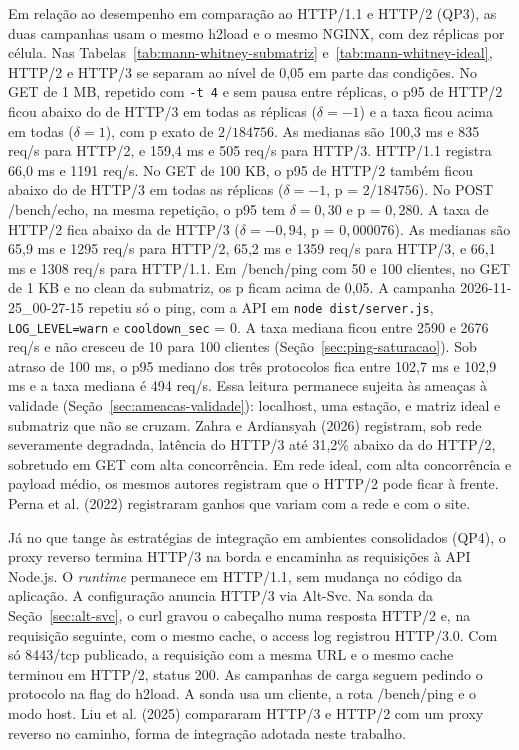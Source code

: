 Em relação ao desempenho em comparação ao HTTP/1.1 e HTTP/2 (QP3), as duas campanhas usam o mesmo h2load e o mesmo NGINX, com dez réplicas por célula. Nas Tabelas~\ref{tab:mann-whitney-submatriz} e~\ref{tab:mann-whitney-ideal}, HTTP/2 e HTTP/3 se separam ao nível de 0,05 em parte das condições. No GET de 1 MB, repetido com \texttt{-t 4} e sem pausa entre réplicas, o p95 de HTTP/2 ficou abaixo do de HTTP/3 em todas as réplicas ($\delta = -1$) e a taxa ficou acima em todas ($\delta = 1$), com p exato de $2/184756$. As medianas são 100,3 ms e 835 req/s para HTTP/2, e 159,4 ms e 505 req/s para HTTP/3. HTTP/1.1 registra 66,0 ms e 1191 req/s. No GET de 100 KB, o p95 de HTTP/2 também ficou abaixo do de HTTP/3 em todas as réplicas ($\delta = -1$, p = $2/184756$). No POST /bench/echo, na mesma repetição, o p95 tem $\delta = 0{,}30$ e p = $0{,}280$. A taxa de HTTP/2 fica abaixo da de HTTP/3 ($\delta = -0{,}94$, p = $0{,}000076$). As medianas são 65,9 ms e 1295 req/s para HTTP/2, 65,2 ms e 1359 req/s para HTTP/3, e 66,1 ms e 1308 req/s para HTTP/1.1. Em /bench/ping com 50 e 100 clientes, no GET de 1 KB e no clean da submatriz, os p ficam acima de 0,05. A campanha 2026-11-25\_00-27-15 repetiu só o ping, com a API em \texttt{node dist/server.js}, \texttt{LOG\_LEVEL=warn} e \texttt{cooldown\_sec} = 0. A taxa mediana ficou entre 2590 e 2676 req/s e não cresceu de 10 para 100 clientes (Seção~\ref{sec:ping-saturacao}). Sob atraso de 100 ms, o p95 mediano dos três protocolos fica entre 102,7 ms e 102,9 ms e a taxa mediana é 494 req/s. Essa leitura permanece sujeita às ameaças à validade (Seção~\ref{sec:ameacas-validade}): localhost, uma estação, e matriz ideal e submatriz que não se cruzam. Zahra e Ardiansyah (2026) registram, sob rede severamente degradada, latência do HTTP/3 até 31,2\% abaixo da do HTTP/2, sobretudo em GET com alta concorrência. Em rede ideal, com alta concorrência e payload médio, os mesmos autores registram que o HTTP/2 pode ficar à frente. Perna et al. (2022) registraram ganhos que variam com a rede e com o site.

Já no que tange às estratégias de integração em ambientes consolidados (QP4), o proxy reverso termina HTTP/3 na borda e encaminha as requisições à API Node.js. O \textit{runtime} permanece em HTTP/1.1, sem mudança no código da aplicação. A configuração anuncia HTTP/3 via Alt-Svc. Na sonda da Seção~\ref{sec:alt-svc}, o curl gravou o cabeçalho numa resposta HTTP/2 e, na requisição seguinte, com o mesmo cache, o access log registrou HTTP/3.0. Com só 8443/tcp publicado, a requisição com a mesma URL e o mesmo cache terminou em HTTP/2, status 200. As campanhas de carga seguem pedindo o protocolo na flag do h2load. A sonda usa um cliente, a rota /bench/ping e o modo host. Liu et al. (2025) compararam HTTP/3 e HTTP/2 com um proxy reverso no caminho, forma de integração adotada neste trabalho.

